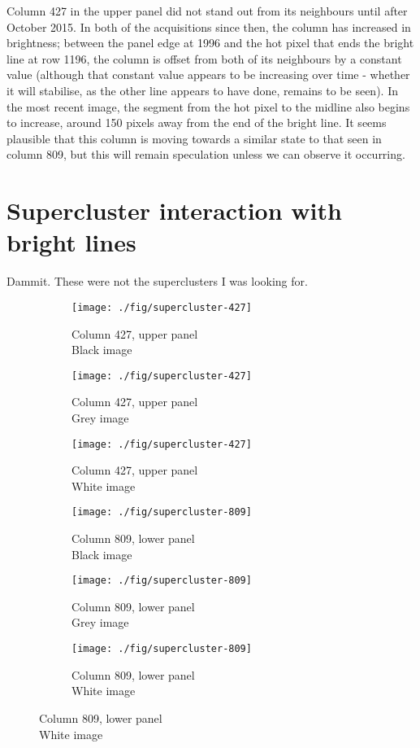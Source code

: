 \documentclass[10pt,fleqn]{article}
\begin{document}
Column 427 in the upper panel did not stand out from its neighbours until after October 2015. In both of the acquisitions since then, the column has increased in brightness; between the panel edge at 1996 and the hot pixel that ends the bright line at row 1196, the column is offset from both of its neighbours by a constant value (although that constant value appears to be increasing over time - whether it will stabilise, as the other line appears to have done, remains to be seen). In the most recent image, the segment from the hot pixel to the midline also begins to increase, around 150 pixels away from the end of the bright line. It seems plausible that this column is moving towards a similar state to that seen in column 809, but this will remain speculation unless we can observe it occurring.

\section{Supercluster interaction with bright lines}

Dammit. These were not the superclusters I was looking for.

\begin{figure}[!ht] %
\caption{Ends of bright lines with identified bad pixels marked.}
\centering
%
\begin{subfigure}[t]{0.32\textwidth}
\caption{Column 427, upper panel\\ Black image}
\texttt{[image: ./fig/supercluster-427]}
\end{subfigure}
%
\begin{subfigure}[t]{0.32\textwidth}
\caption{Column 427, upper panel\\ Grey image}
\texttt{[image: ./fig/supercluster-427]}
\end{subfigure}
%
\begin{subfigure}[t]{0.32\textwidth}
\caption{Column 427, upper panel\\ White image}
\texttt{[image: ./fig/supercluster-427]}
\end{subfigure}
%
%
%
\begin{subfigure}[t]{0.32\textwidth}
\caption{Column 809, lower panel\\ Black image}
\texttt{[image: ./fig/supercluster-809]}
\end{subfigure}
%
\begin{subfigure}[t]{0.32\textwidth}
\caption{Column 809, lower panel\\ Grey image}
\texttt{[image: ./fig/supercluster-809]}
\end{subfigure}
%
\begin{subfigure}[t]{0.32\textwidth}
\caption{Column 809, lower panel\\ White image}
\texttt{[image: ./fig/supercluster-809]}
\end{subfigure}
%
\end{figure}
\end{document}
